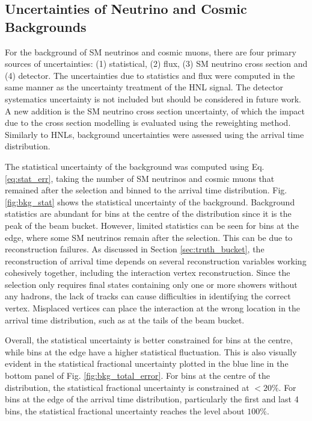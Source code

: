 \subsection{Uncertainties of Neutrino and Cosmic Backgrounds}
\label{sec:bkg_error}

For the background of SM neutrinos and cosmic muons, there are four primary sources of uncertainties: (1) statistical, (2) flux, (3) SM neutrino cross section and (4) detector.
The uncertainties due to statistics and flux were computed in the same manner as the uncertainty treatment of the HNL signal.
The detector systematics uncertainty is not included but should be considered in future work.
A new addition is the SM neutrino cross section uncertainty, of which the impact due to the cross section modelling is evaluated using the reweighting method.
Similarly to HNLs, background uncertainties were assessed using the arrival time distribution.  

The statistical uncertainty of the background was computed using Eq. \ref{eq:stat_err}, taking the number of SM neutrinos and cosmic muons that remained after the selection and binned to the arrival
 time distribution.
Fig. \ref{fig:bkg_stat} shows the statistical uncertainty of the background.
Background statistics are abundant for bins at the centre of the distribution since it is the peak of the beam bucket.
However, limited statistics can be seen for bins at the edge, where some SM neutrinos remain after the selection.
This can be due to reconstruction failures.
As discussed in Section \ref{sec:truth_bucket}, the reconstruction of arrival time depends on several reconstruction variables working cohesively together, including the interaction vertex reconstruction.
Since the selection only requires final states containing only one or more showers without any hadrons, the lack of tracks can cause difficulties in identifying the correct vertex.
Misplaced vertices can place the interaction at the wrong location in the arrival time distribution, such as at the tails of the beam bucket.

Overall, the statistical uncertainty is better constrained for bins at the centre, while bins at the edge have a higher statistical fluctuation.
This is also visually evident in the statistical fractional uncertainty plotted in the blue line in the bottom panel of Fig. \ref{fig:bkg_total_error}.
For bins at the centre of the distribution, the statistical fractional uncertainty is constrained at $< 20\%$.
For bins at the edge of the arrival time distribution, particularly the first and last 4 bins, the statistical fractional uncertainty reaches the level about $100\%$.

